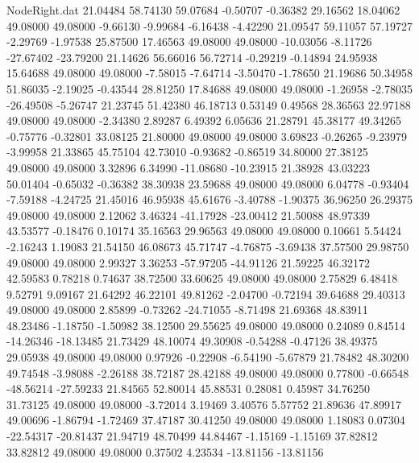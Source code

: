 \begin{filecontents}{NodeRight.dat}
  21.04484   58.74130   59.07684    -0.50707   -0.36382   29.16562   18.04062   49.08000   49.08000   -9.66130   -9.99684   -6.16438   -4.42290
  21.09547   59.11057   57.19727    -2.29769   -1.97538   25.87500   17.46563   49.08000   49.08000  -10.03056   -8.11726  -27.67402  -23.79200
  21.14626   56.66016   56.72714    -0.29219   -0.14894   24.95938   15.64688   49.08000   49.08000   -7.58015   -7.64714   -3.50470   -1.78650
  21.19686   50.34958   51.86035    -2.19025   -0.43544   28.81250   17.84688   49.08000   49.08000   -1.26958   -2.78035  -26.49508   -5.26747
  21.23745   51.42380   46.18713     0.53149    0.49568   28.36563   22.97188   49.08000   49.08000   -2.34380    2.89287    6.49392    6.05636
  21.28791   45.38177   49.34265    -0.75776   -0.32801   33.08125   21.80000   49.08000   49.08000    3.69823   -0.26265   -9.23979   -3.99958
  21.33865   45.75104   42.73010    -0.93682   -0.86519   34.80000   27.38125   49.08000   49.08000    3.32896    6.34990  -11.08680  -10.23915
  21.38928   43.03223   50.01404    -0.65032   -0.36382   38.30938   23.59688   49.08000   49.08000    6.04778   -0.93404   -7.59188   -4.24725
  21.45016   46.95938   45.61676    -3.40788   -1.90375   36.96250   26.29375   49.08000   49.08000    2.12062    3.46324  -41.17928  -23.00412
  21.50088   48.97339   43.53577    -0.18476    0.10174   35.16563   29.96563   49.08000   49.08000    0.10661    5.54424   -2.16243    1.19083
  21.54150   46.08673   45.71747    -4.76875   -3.69438   37.57500   29.98750   49.08000   49.08000    2.99327    3.36253  -57.97205  -44.91126
  21.59225   46.32172   42.59583     0.78218    0.74637   38.72500   33.60625   49.08000   49.08000    2.75829    6.48418    9.52791    9.09167
  21.64292   46.22101   49.81262    -2.04700   -0.72194   39.64688   29.40313   49.08000   49.08000    2.85899   -0.73262  -24.71055   -8.71498
  21.69368   48.83911   48.23486    -1.18750   -1.50982   38.12500   29.55625   49.08000   49.08000    0.24089    0.84514  -14.26346  -18.13485
  21.73429   48.10074   49.30908    -0.54288   -0.47126   38.49375   29.05938   49.08000   49.08000    0.97926   -0.22908   -6.54190   -5.67879
  21.78482   48.30200   49.74548    -3.98088   -2.26188   38.72187   28.42188   49.08000   49.08000    0.77800   -0.66548  -48.56214  -27.59233
  21.84565   52.80014   45.88531     0.28081    0.45987   34.76250   31.73125   49.08000   49.08000   -3.72014    3.19469    3.40576    5.57752
  21.89636   47.89917   49.00696    -1.86794   -1.72469   37.47187   30.41250   49.08000   49.08000    1.18083    0.07304  -22.54317  -20.81437
  21.94719   48.70499   44.84467    -1.15169   -1.15169   37.82812   33.82812   49.08000   49.08000    0.37502    4.23534  -13.81156  -13.81156

\end{filecontents}

